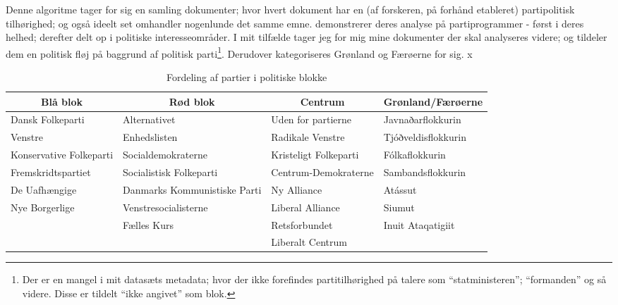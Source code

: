 Denne algoritme tager for sig en samling dokumenter; hvor hvert dokument har en (af forskeren, på forhånd etableret) partipolitisk tilhørighed; og også ideelt set omhandler nogenlunde det samme emne.
\citeauthor{slapinScalingModelEstimating2008} demonstrerer deres analyse på partiprogrammer - først i deres helhed; derefter delt op i politiske interesseområder.
I mit tilfælde tager jeg for mig mine dokumenter der skal analyseres videre; og tildeler dem en politisk fløj på baggrund af politisk parti\footnote{Der er en mangel i mit datasæts metadata; hvor der ikke forefindes partitilhørighed på talere som “statministeren”; “formanden” og så videre. Disse er tildelt “ikke angivet” som blok.}.
Derudover kategoriseres Grønland og Færøerne for sig.
x
\begin{table}
\caption{Fordeling af partier i politiske blokke}
\label{tab:party2bloc}
\begin{adjustwidth}{-0.8in}{-0.8in}
\begin{tabular}{@{}llll@{}}
\multicolumn{1}{c}{\textbf{Blå blok}} & \multicolumn{1}{c}{\textbf{Rød blok}} & \multicolumn{1}{c}{\textbf{Centrum}} & \multicolumn{1}{c}{\textbf{Grønland/Færøerne}} \\ \midrule
Dansk Folkeparti        & Alternativet                  & Uden for partierne    & Javnaðarflokkurin                           \\
Venstre                 & Enhedslisten                  & Radikale Venstre      & Tjóðveldisflokkurin                         \\
Konservative Folkeparti & Socialdemokraterne            & Kristeligt Folkeparti & Fólkaflokkurin                              \\
Fremskridtspartiet      & Socialistisk Folkeparti       & Centrum-Demokraterne  & Sambandsflokkurin                           \\
De Uafhængige           & Danmarks Kommunistiske Parti  & Ny Alliance           & Atássut                                     \\
Nye Borgerlige          & Venstresocialisterne          & Liberal Alliance      & Siumut                                      \\
                        & Fælles Kurs                   & Retsforbundet         & Inuit Ataqatigiit                            \\
                        & & Liberalt Centrum            &                                                \\ \bottomrule
\end{tabular}
\end{adjustwidth}
\end{table}


